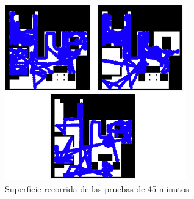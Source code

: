 \begin{figure}[H]
  \begin{center}
    \includegraphics[width=0.7\textwidth]{figures/Vacuum/Referee_45MIN.png}
		\caption{Superficie recorrida de las pruebas de 45 minutos}
		\label{fig.Referee_45MIN}
		\end{center}
\end{figure}